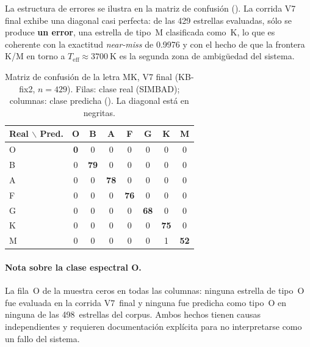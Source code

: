 La estructura de errores se ilustra en la matriz de confusión
(). La corrida V7 final exhibe una diagonal casi perfecta:
de las \num{429} estrellas evaluadas, sólo se produce \textbf{un error}, una
estrella de tipo~M clasificada como~K, lo que es coherente con la exactitud
\emph{near-miss} de \num{0.9976} y con el hecho de que la frontera K/M en torno a
$T_\mathrm{eff}\approx\SI{3700}{\kelvin}$ es la segunda zona de ambigüedad del
sistema.

\begin{table}[H]
  \centering
  \caption{Matriz de confusión de la letra MK, V7 final (KB-fix2, $n=429$).
  Filas: clase real (SIMBAD); columnas: clase predicha (\STELLAR{}).
  La diagonal está en negritas.}
  \label{tab:confusion}
  \begin{tabular}{l ccccccc}
    \toprule
    Real $\backslash$ Pred. & O & B & A & F & G & K & M \\
    \midrule
    O & \textbf{0}  & 0          & 0          & 0          & 0          & 0          & 0 \\
    B & 0           & \textbf{79}& 0          & 0          & 0          & 0          & 0 \\
    A & 0           & 0          & \textbf{78}& 0          & 0          & 0          & 0 \\
    F & 0           & 0          & 0          & \textbf{76}& 0          & 0          & 0 \\
    G & 0           & 0          & 0          & 0          & \textbf{68}& 0          & 0 \\
    K & 0           & 0          & 0          & 0          & 0          & \textbf{75}& 0 \\
    M & 0           & 0          & 0          & 0          & 0          & 1          & \textbf{52}\\
    \bottomrule
  \end{tabular}
\end{table}

\paragraph{Nota sobre la clase espectral O.}
\label{par:clase-o}
La fila~O de la  muestra ceros en todas las columnas: ninguna
estrella de tipo~O fue evaluada en la corrida V7~final y ninguna fue predicha como
tipo~O en ninguna de las \num{498}~estrellas del corpus. Ambos hechos tienen causas
independientes y requieren documentación explícita para no interpretarse como un
fallo del sistema.

